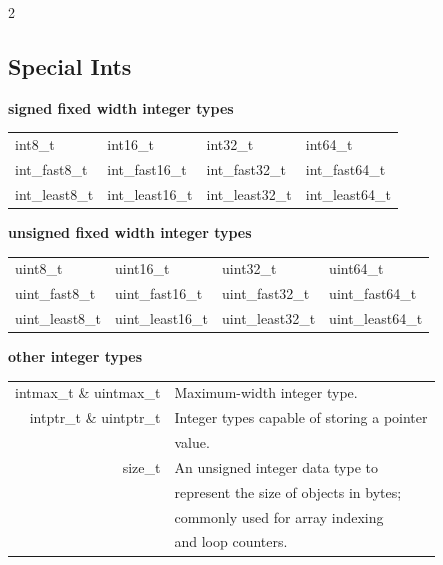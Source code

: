 \documentclass[5pt]{article}
\begin{document}
\begin{multicols}{2}
\subsection{Special Ints}
\textbf{signed fixed width integer types}\\
\begin{tabular}{>{\small\ttfamily}l >{\small\ttfamily}l >{\small\ttfamily}l >{\small\ttfamily}l}
int8\_t         & int16\_t          & int32\_t          & int64\_t          \\
int\_fast8\_t   & int\_fast16\_t    & int\_fast32\_t    & int\_fast64\_t    \\
int\_least8\_t  & int\_least16\_t   & int\_least32\_t   & int\_least64\_t   \\
\end{tabular}
\textbf{unsigned fixed width integer types}\\
\begin{tabular}{>{\small\ttfamily}l >{\small\ttfamily}l >{\small\ttfamily}l >{\small\ttfamily}l}
uint8\_t        & uint16\_t         & uint32\_t         & uint64\_t         \\
uint\_fast8\_t  & uint\_fast16\_t   & uint\_fast32\_t   & uint\_fast64\_t   \\
uint\_least8\_t & uint\_least16\_t  & uint\_least32\_t  & uint\_least64\_t  \\
\end{tabular}
\textbf{other integer types}\\
\begin{tabular}{>{\small\ttfamily}r l}
    intmax\_t \& uintmax\_t & Maximum-width integer type.\\
    intptr\_t \& uintptr\_t & Integer types capable of storing a pointer\\
                            & value.\\
    size\_t & An unsigned integer data type to\\
            & represent the size of objects in bytes;\\
            & commonly used for array indexing\\
            & and loop counters.\\  
\end{tabular}  


\end{multicols}
\end{document}

